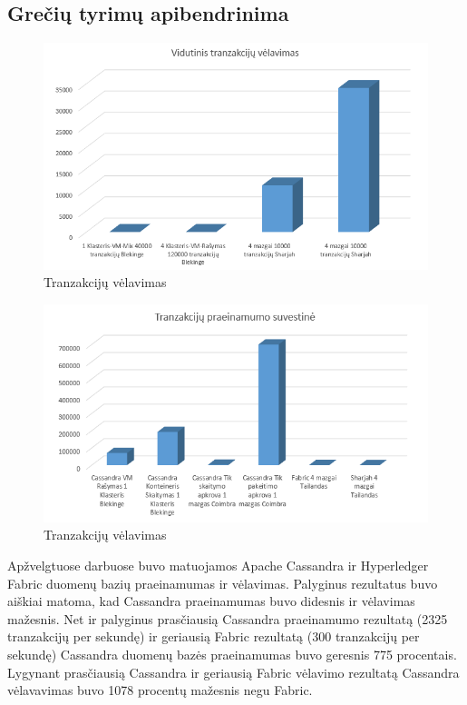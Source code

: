 \documentclass{VUMIFPSkursinis}
\begin{document}
	\subsection{Grečių tyrimų apibendrinima}
		\begin{figure}[H]
		    \centering
		    \includegraphics[scale=0.5]{img/CasHypLat}
		    \caption{Tranzakcijų vėlavimas}   %
		    \label{img:mlp}
		\end{figure}
		\begin{figure}[H]
		    \centering
		    \includegraphics[scale=0.5]{img/CasHypTp}
		    \caption{Tranzakcijų vėlavimas}   %
		    \label{img:mlp}
		\end{figure}

		Apžvelgtuose darbuose buvo matuojamos Apache Cassandra ir Hyperledger Fabric duomenų bazių praeinamumas ir vėlavimas.
		Palyginus rezultatus buvo aiškiai matoma, kad Cassandra praeinamumas buvo didesnis ir vėlavimas mažesnis. 
		Net ir palyginus prasčiausią Cassandra praeinamumo rezultatą (2325 tranzakcijų per sekundę) ir geriausią Fabric rezultatą (300 tranzakcijų per sekundę) Cassandra duomenų bazės 	praeinamumas buvo geresnis 775 procentais. Lygynant prasčiausią Cassandra ir geriausią Fabric vėlavimo rezultatą Cassandra vėlavavimas buvo 1078 procentų mažesnis negu 				Fabric.
\pagebreak
\end{document}
